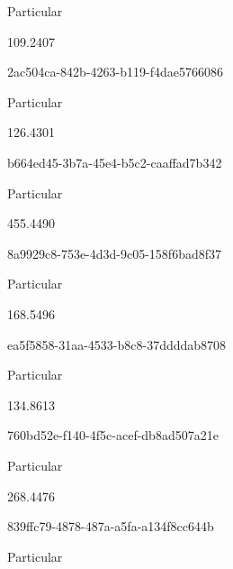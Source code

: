 \documentclass[
  11pt,
  a4paper,
  DIV=11,
  numbers=noendperiod]{scrartcl}
\begin{document}
Particular

\n      

109.2407

\n    

\n    

\n      

2ac504ca-842b-4263-b119-f4dae5766086

\n      

Particular

\n      

126.4301

\n    

\n    

\n      

b664ed45-3b7a-45e4-b5c2-caaffad7b342

\n      

Particular

\n      

455.4490

\n    

\n    

\n      

8a9929c8-753e-4d3d-9c05-158f6bad8f37

\n      

Particular

\n      

168.5496

\n    

\n    

\n      

ea5f5858-31aa-4533-b8c8-37ddddab8708

\n      

Particular

\n      

134.8613

\n    

\n    

\n      

760bd52e-f140-4f5c-acef-db8ad507a21e

\n      

Particular

\n      

268.4476

\n    

\n    

\n      

839ffc79-4878-487a-a5fa-a134f8cc644b

\n      

Particular
\end{document}
